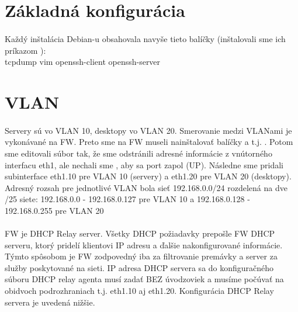\section{Základná konfigurácia}
\paragraph{}
Každý inštalácia Debian-u obsahovala navyše tieto balíčky (inštalovali sme ich príkazom ):\\
tcpdump vim openssh-client openssh-server

\section{VLAN}
\paragraph{}
Servery sú vo VLAN 10, desktopy vo VLAN 20. Smerovanie medzi VLANami je vykonávané na FW. Preto sme na FW museli nainštalovať balíčky  a  t.j. . Potom sme editovali súbor  tak, že sme odstránili adresné informácie z vnútorného interfacu eth1, ale nechali sme , aby sa port zapol (UP). Následne sme pridali subinterface eth1.10 pre VLAN 10 (servery) a eth1.20 pre VLAN 20 (desktopy). Adresný rozsah pre jednotlivé VLAN bola sieť 192.168.0.0/24 rozdelená na dve /25 siete: 192.168.0.0 - 192.168.0.127 pre VLAN 10 a 192.168.0.128 - 192.168.0.255 pre VLAN 20
\paragraph{}
FW je DHCP Relay server. Všetky DHCP požiadavky prepošle FW DHCP serveru, ktorý pridelí klientovi IP adresu a ďalšie nakonfigurované informácie. Týmto spôsobom je FW zodpovedný iba za filtrovanie premávky a server za služby poskytované na sieti. IP adresa DHCP servera sa do konfiguračného súboru  DHCP relay agenta musí zadať BEZ úvodzoviek a musíme počúvať na obidvoch podrozhraniach t.j. eth1.10 aj eth1.20. Konfigurácia DHCP Relay servera je uvedená nižšie.

